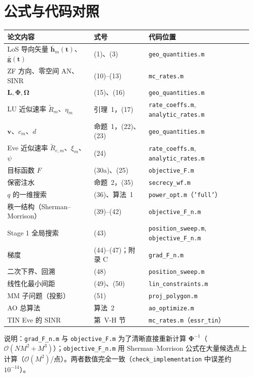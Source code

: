 \documentclass[11pt,a4paper]{ctexart}
\newcommand{\code}[1]{\texttt{#1}}
\newcommand{\bt}{\mathbf t}
\begin{document}
\section{公式与代码对照}
\begin{longtable}{p{5.6cm}p{3.6cm}p{6.2cm}}
\toprule
论文内容 & 式号 & 代码位置 \\ \midrule
LoS 导向矢量 $\bar{\mathbf h}_m(\bt)$、$\bar{\mathbf g}(\bt)$ & (1)、(3) & \code{geo\_quantities.m} \\
ZF 方向、零空间 AN、SINR & (10)--(13) & \code{mc\_rates.m} \\
$\mathbf L,\boldsymbol\Phi,\boldsymbol\Omega$ & (15)、(16) & \code{geo\_quantities.m} \\
LU 近似速率 $\tilde R_m$、$\eta_m$ & 引理~1，(17) & \code{rate\_coeffs.m}, \code{analytic\_rates.m} \\
$\mathbf v$、$c_m$、$d$ & 命题~1，(22)、(23) & \code{geo\_quantities.m} \\
Eve 近似速率 $\tilde R_{e,m}$、$\xi_m$、$\psi$ & (24) & \code{rate\_coeffs.m}, \code{analytic\_rates.m} \\
目标函数 $F$ & (30a)、(25) & \code{objective\_F.m} \\
保密注水 & 命题~2，(35) & \code{secrecy\_wf.m} \\
$q$ 的一维搜索 & (36)、算法~1 & \code{power\_opt.m}（\code{'full'}）\\
秩一结构（Sherman--Morrison）& (39)--(42) & \code{objective\_F\_n.m} \\
Stage 1 全局搜索 & (43) & \code{position\_sweep.m}, \code{objective\_F\_n.m} \\
梯度 & (44)--(47)；附录 C & \code{grad\_F\_n.m} \\
二次下界、回溯 & (48) & \code{position\_sweep.m} \\
线性化最小间距 & (49)、(50) & \code{lin\_constraints.m} \\
MM 子问题（投影） & (51) & \code{proj\_polygon.m} \\
AO 总算法 & 算法~2 & \code{ao\_optimize.m} \\
TIN Eve 的 SINR & 第~V-H 节 & \code{mc\_rates.m}（\code{essr\_tin}）\\
\bottomrule
\end{longtable}
\noindent 说明：\code{grad\_F\_n.m} 与 \code{objective\_F.m} 为了清晰直接重新计算 $\boldsymbol\Phi^{-1}$（$\mathcal O(NM^2+M^3)$）；\code{objective\_F\_n.m} 用 Sherman--Morrison 公式在大量候选点上计算（$\mathcal O(M^2)$/点）。两者数值完全一致（\code{check\_implementation} 中误差约 $10^{-14}$）。
\end{document}
